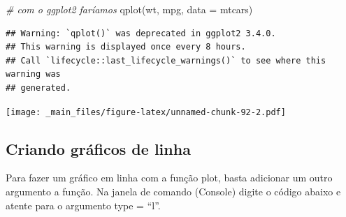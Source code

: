 \documentclass[
]{book}
\newenvironment{Shaded}{\begin{snugshade}}{\end{snugshade}}
\newcommand{\AttributeTok}[1]{\textcolor[rgb]{0.77,0.63,0.00}{#1}}
\newcommand{\CommentTok}[1]{\textcolor[rgb]{0.56,0.35,0.01}{\textit{#1}}}
\newcommand{\DecValTok}[1]{\textcolor[rgb]{0.00,0.00,0.81}{#1}}
\newcommand{\FunctionTok}[1]{\textcolor[rgb]{0.00,0.00,0.00}{#1}}
\newcommand{\NormalTok}[1]{#1}
\newcommand{\SpecialCharTok}[1]{\textcolor[rgb]{0.00,0.00,0.00}{#1}}
\newcommand{\StringTok}[1]{\textcolor[rgb]{0.31,0.60,0.02}{#1}}
\begin{document}
\begin{Shaded}
\begin{Highlighting}[]
\CommentTok{\# com o ggplot2 faríamos}
\FunctionTok{qplot}\NormalTok{(wt, mpg, }\AttributeTok{data =}\NormalTok{ mtcars)}
\end{Highlighting}
\end{Shaded}

\begin{verbatim}
## Warning: `qplot()` was deprecated in ggplot2 3.4.0.
## This warning is displayed once every 8 hours.
## Call `lifecycle::last_lifecycle_warnings()` to see where this warning was
## generated.
\end{verbatim}

\texttt{[image: \_main\_files/figure-latex/unnamed-chunk-92-2.pdf]}

\hypertarget{criando-gruxe1ficos-de-linha}{%
\subsection{Criando gráficos de linha}\label{criando-gruxe1ficos-de-linha}}

Para fazer um gráfico em linha com a função plot, basta adicionar um outro argumento a função. Na janela de comando (Console) digite o código abaixo e atente para o argumento type = ``l''.

\begin{Shaded}
\end{Shaded}
\end{document}

